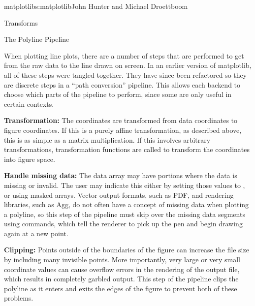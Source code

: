 \begin{aosachapter}{matplotlib}{s:matplotlib}{John Hunter and Michael Droettboom}
\begin{aosasect1}{Transforms}

\end{aosasect1}

\begin{aosasect1}{The Polyline Pipeline}

When plotting line plots, there are a number of steps that are
performed to get from the raw data to the line drawn on screen.  In an
earlier version of matplotlib, all of these steps were tangled
together.  They have since been refactored so they are discrete steps
in a ``path conversion'' pipeline.  This allows each backend to choose
which parts of the pipeline to perform, since some are only useful in
certain contexts.


\begin{aosaitemize}

\item \textbf{Transformation:} The coordinates are transformed from data
  coordinates to figure coordinates.  If this is a purely affine
  transformation, as described above, this is as simple as a matrix
  multiplication.  If this involves arbitrary transformations,
  transformation functions are called to transform the coordinates
  into figure space.

\item \textbf{Handle missing data:} The data array may have portions
  where the data is missing or invalid.  The user may indicate this
  either by setting those values to , or using  masked arrays.
  Vector output formats, such as PDF, and rendering libraries, such as
  Agg, do not often have a concept of missing data when plotting a
  polyline, so this step of the pipeline must skip over the missing
  data segments using  commands, which tell the renderer
  to pick up the pen and begin drawing again at a new point.

\item \textbf{Clipping:} Points outside of the boundaries of the
  figure can increase the file size by including many invisible
  points.  More importantly, very large or very small coordinate
  values can cause overflow errors in the rendering of the output
  file, which results in completely garbled output.  This step of the
  pipeline clips the polyline as it enters and exits the edges of the
  figure to prevent both of these problems.


\end{aosaitemize}
\end{aosasect1}
\end{aosachapter}
